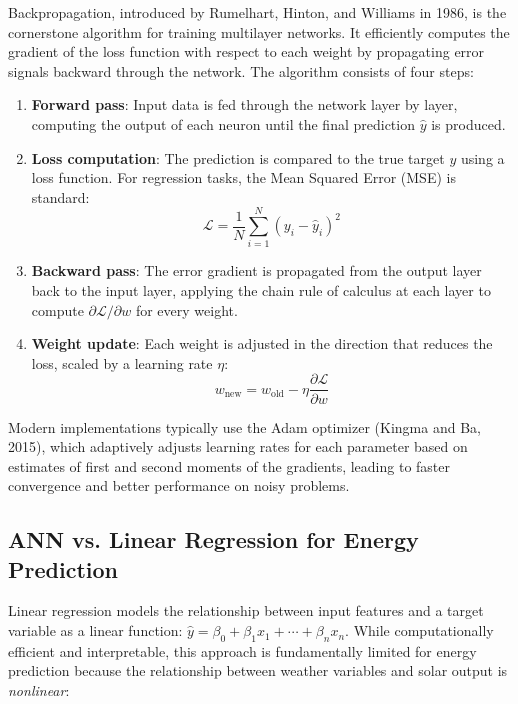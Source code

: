 \documentclass[11pt, a4paper]{article}
\begin{document}
Backpropagation, introduced by Rumelhart, Hinton, and Williams in 1986, is the
cornerstone algorithm for training multilayer networks. It efficiently computes
the gradient of the loss function with respect to each weight by propagating error
signals backward through the network. The algorithm consists of four steps:

\begin{enumerate}
    \item \textbf{Forward pass}: Input data is fed through the network layer by layer,
    computing the output of each neuron until the final prediction $\hat{y}$ is produced.
    \item \textbf{Loss computation}: The prediction is compared to the true target $y$
    using a loss function. For regression tasks, the Mean Squared Error (MSE) is
    standard:
    \begin{equation}\label{eq:mse}
    \mathcal{L} = \frac{1}{N} \sum_{i=1}^{N} (y_i - \hat{y}_i)^2
    \end{equation}
    \item \textbf{Backward pass}: The error gradient is propagated from the output
    layer back to the input layer, applying the chain rule of calculus at each layer
    to compute $\partial \mathcal{L} / \partial w$ for every weight.
    \item \textbf{Weight update}: Each weight is adjusted in the direction that
    reduces the loss, scaled by a learning rate $\eta$:
    \begin{equation}\label{eq:sgd}
    w_{\text{new}} = w_{\text{old}} - \eta \frac{\partial \mathcal{L}}{\partial w}
    \end{equation}
\end{enumerate}

Modern implementations typically use the Adam optimizer (Kingma and Ba, 2015),
which adaptively adjusts learning rates for each parameter based on estimates of
first and second moments of the gradients, leading to faster convergence and better
performance on noisy problems.

\subsection{ANN vs. Linear Regression for Energy Prediction}

Linear regression models the relationship between input features and a target
variable as a linear function: $\hat{y} = \beta_0 + \beta_1 x_1 + \cdots + \beta_n x_n$.
While computationally efficient and interpretable, this approach is fundamentally
limited for energy prediction because the relationship between weather variables
and solar output is \textit{nonlinear}:
\end{document}
